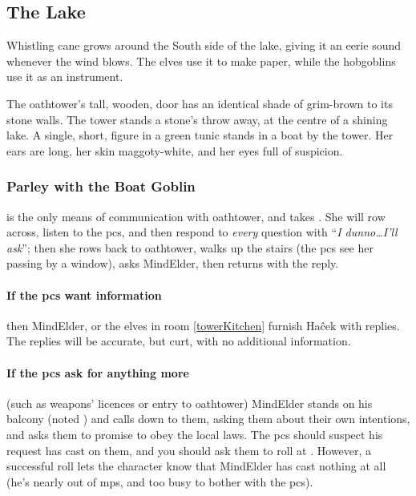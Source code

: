 \begin{multicols}{2}

\subsection{The Lake}

\noindent
Whistling cane grows around the South side of the lake, giving it an eerie sound whenever the wind blows.%
The elves use it to make paper, while the hobgoblins use it as an instrument.

\begin{boxtext}
  The \gls{oathtower}'s tall, wooden, door has an identical shade of grim-brown to its stone walls.
  The tower stands a stone's throw away, at the centre of a shining lake.
  A single, short, figure in a green tunic stands in a boat by the tower.
  Her ears are long, her skin maggoty-white, and her eyes full of suspicion.
\end{boxtext}

\subsubsection{Parley with the Boat Goblin}
is the only means of communication with \gls{oathtower}, and takes .
She will row across, listen to the \glspl{pc}, and then respond to \emph{every} question with ``\textit{I dunno\ldots I'll ask}''; then she rows back to \gls{oathtower}, walks up the stairs (the \glspl{pc} see her passing by a window), asks \gls{MindElder}, then returns with the reply.

\paragraph{If the \glspl{pc} want information}
then \gls{MindElder}, or the elves in room \vref{towerKitchen} furnish Ha\^{c}ek with replies.
The replies will be accurate, but curt, with no additional information.

\paragraph{If the \glspl{pc} ask for anything more}
(such as weapons' licences or entry to \gls{oathtower})
\Gls{MindElder} stands on his balcony (noted ) and calls down to them, asking them about their own intentions, and asks them to promise to obey the local laws.
The \glspl{pc} should suspect his request has cast  on them, and you should ask them to roll  at \tn[13].
However, a successful roll lets the character know that \gls{MindElder} has cast nothing at all (he's nearly out of \glspl{mp}, and too busy to bother with the \glspl{pc}).


\end{multicols}
